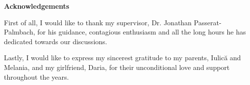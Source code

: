 \thispagestyle{empty}

\begin{center}
\vspace*{4cm}
\textbf{Acknowledgements}
\end{center}

\vspace*{0.3cm}
\begin{spacing}{1.0}
First of all, I would like to thank my supervisor, Dr. Jonathan Passerat-Palmbach, for his guidance, contagious enthusiasm and all the long hours he has dedicated towards our discussions.

Lastly, I would like to express my sincerest gratitude to my parents, Iulic\u{a} and Melania, and my girlfriend, Daria, for their unconditional love and support throughout the years.
\end{spacing}

\newpage
\blankpage